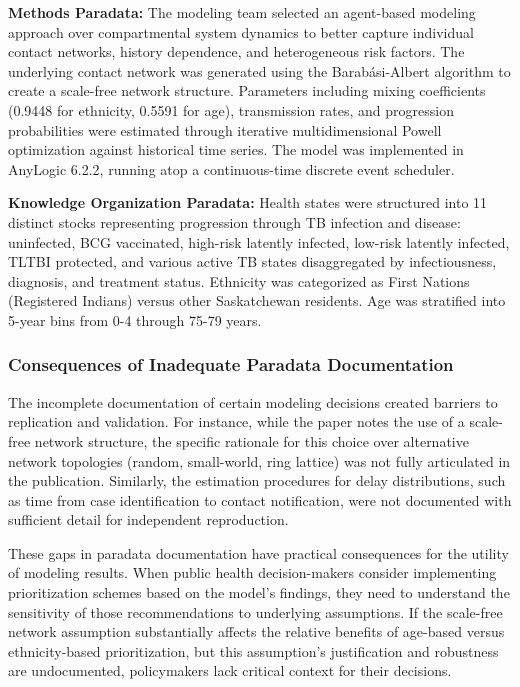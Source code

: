 \textbf{Methods Paradata:} The modeling team selected an agent-based modeling approach over compartmental system dynamics to better capture individual contact networks, history dependence, and heterogeneous risk factors.
The underlying contact network was generated using the Barabási-Albert algorithm to create a scale-free network structure.
Parameters including mixing coefficients (0.9448 for ethnicity, 0.5591 for age), transmission rates, and progression probabilities were estimated through iterative multidimensional Powell optimization against historical time series.
The model was implemented in AnyLogic 6.2.2, running atop a continuous-time discrete event scheduler.

\textbf{Knowledge Organization Paradata:} Health states were structured into 11 distinct stocks representing progression through TB infection and disease: uninfected, BCG vaccinated, high-risk latently infected, low-risk latently infected, TLTBI protected, and various active TB states disaggregated by infectiousness, diagnosis, and treatment status.
Ethnicity was categorized as First Nations (Registered Indians) versus other Saskatchewan residents.
Age was stratified into 5-year bins from 0-4 through 75-79 years.

\subsubsection{Consequences of Inadequate Paradata Documentation}

The incomplete documentation of certain modeling decisions created barriers to replication and validation.
For instance, while the paper notes the use of a scale-free network structure, the specific rationale for this choice over alternative network topologies (random, small-world, ring lattice) was not fully articulated in the publication.
Similarly, the estimation procedures for delay distributions, such as time from case identification to contact notification, were not documented with sufficient detail for independent reproduction.

These gaps in paradata documentation have practical consequences for the utility of modeling results.
When public health decision-makers consider implementing prioritization schemes based on the model's findings, they need to understand the sensitivity of those recommendations to underlying assumptions.
If the scale-free network assumption substantially affects the relative benefits of age-based versus ethnicity-based prioritization, but this assumption's justification and robustness are undocumented, policymakers lack critical context for their decisions.


